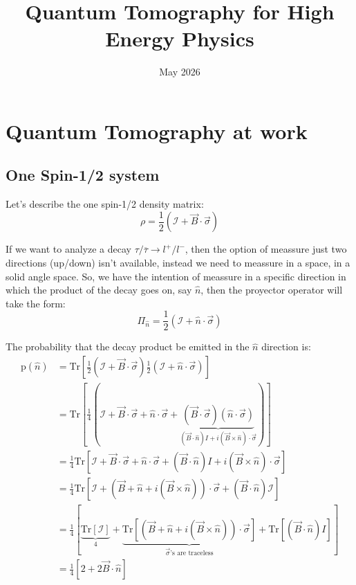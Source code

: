 \documentclass[onecolumn, amsmath, amssymb, aps, prd]{revtex4-2}
\title{Quantum Tomography for High Energy Physics}
\date{May 2026}
\begin{document}
\maketitle

\section{Quantum Tomography at work}
	\subsection{One Spin-1/2 system}
		Let's describe the one spin-1/2 density matrix:
		\begin{equation}
			\rho = \frac{1}{2} \left( \mathcal{I} + \vec{B} \cdot \vec{\sigma} \right)
		\end{equation}

		If we want to analyze a decay $\tau / \overline{\tau} \rightarrow l^+ / l^-$, then the option of meassure just two directions (up/down) isn't available, instead we need to meassure in a space, in a solid angle space. So, we have the intention of meassure in a specific direction in which the product of the decay goes on, say $\hat{n}$, then the proyector operator will take the form:
		\begin{equation}
			\Pi_{\hat{n}} = \frac{1}{2} \left( \mathcal{I} + \hat{n} \cdot \vec{\sigma} \right)
		\end{equation}

		The probability that the decay product be emitted in the $\hat{n}$ direction is:
		\begin{equation}
			\begin{split}
				\text{p}(\hat{n}) & = \text{Tr} \left[ \frac{1}{2} \left( \mathcal{I} + \vec{B} \cdot \vec{\sigma} \right) \frac{1}{2} \left( \mathcal{I} + \hat{n} \cdot \vec{\sigma} \right) \right] \\
				& = \text{Tr} \left[ \frac{1}{4} \left( \mathcal{I} + \vec{B} \cdot \vec{\sigma} + \hat{n} \cdot \vec{\sigma} + \underbrace{(\vec{B} \cdot \vec{\sigma})(\hat{n} \cdot \vec{\sigma})}_{(\vec{B} \cdot \hat{n})I + i(\vec{B} \times \hat{n})\cdot \vec{\sigma}} \right) \right] \\
				& = \frac{1}{4} \text{Tr} \left[ \mathcal{I} + \vec{B} \cdot \vec{\sigma} + \hat{n} \cdot \vec{\sigma} + (\vec{B} \cdot \hat{n})I + i(\vec{B} \times \hat{n})\cdot \vec{\sigma} \right] \\
				& = \frac{1}{4} \text{Tr} \left[ \mathcal{I} + \left( \vec{B} + \hat{n} + i(\vec{B} \times \hat{n}) \right) \cdot \vec{\sigma} + (\vec{B} \cdot \hat{n}) \mathcal{I} \right] \\
				& = \frac{1}{4} \left[ \underbrace{\text{Tr} \left[ \mathcal{I} \right]}_{4} + \underbrace{\text{Tr} \left[ \left( \vec{B} + \hat{n} + i(\vec{B} \times \hat{n}) \right) \cdot \vec{\sigma} \right]}_{\vec{\sigma} \text{'s are traceless}} + \text{Tr} \left[ (\vec{B} \cdot \hat{n})I \right]  \right] \\
				& = \frac{1}{4} \left[ 2 + 2 \vec{B} \cdot \hat{n} \right]
			\end{split}
		\end{equation}
\end{document}
